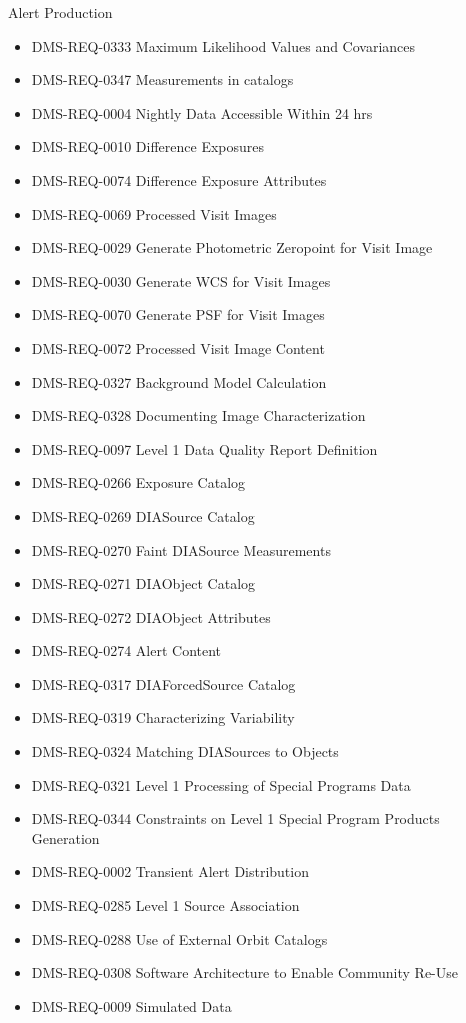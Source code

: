 Alert Production \begin{itemize}
\item DMS-REQ-0333 Maximum Likelihood Values and Covariances
\item DMS-REQ-0347 Measurements in catalogs
\item DMS-REQ-0004 Nightly Data Accessible Within 24 hrs
\item DMS-REQ-0010 Difference Exposures
\item DMS-REQ-0074 Difference Exposure Attributes
\item DMS-REQ-0069 Processed Visit Images
\item DMS-REQ-0029 Generate Photometric Zeropoint for Visit Image
\item DMS-REQ-0030 Generate WCS for Visit Images
\item DMS-REQ-0070 Generate PSF for Visit Images
\item DMS-REQ-0072 Processed Visit Image Content
\item DMS-REQ-0327 Background Model Calculation
\item DMS-REQ-0328 Documenting Image Characterization
\item DMS-REQ-0097 Level 1 Data Quality Report Definition
\item DMS-REQ-0266 Exposure Catalog
\item DMS-REQ-0269 DIASource Catalog
\item DMS-REQ-0270 Faint DIASource Measurements
\item DMS-REQ-0271 DIAObject Catalog
\item DMS-REQ-0272 DIAObject Attributes
\item DMS-REQ-0274 Alert Content
\item DMS-REQ-0317 DIAForcedSource Catalog
\item DMS-REQ-0319 Characterizing Variability
\item DMS-REQ-0324 Matching DIASources to Objects
\item DMS-REQ-0321 Level 1 Processing of Special Programs Data
\item DMS-REQ-0344 Constraints on Level 1 Special Program Products Generation
\item DMS-REQ-0002 Transient Alert Distribution
\item DMS-REQ-0285 Level 1 Source Association
\item DMS-REQ-0288 Use of External Orbit Catalogs
\item DMS-REQ-0308 Software Architecture to Enable Community Re-Use
\item DMS-REQ-0009 Simulated Data

\end{itemize}
